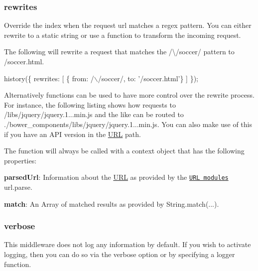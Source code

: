 \subsubsection*{rewrites}

Override the index when the request url matches a regex pattern. You can either rewrite to a static string or use a function to transform the incoming request.

The following will rewrite a request that matches the {\ttfamily /\textbackslash{}/soccer/} pattern to {\ttfamily /soccer.html}. 
\begin{DoxyCode}
history(\{
  rewrites: [
    \{ from: /\(\backslash\)/soccer/, to: '/soccer.html'\}
  ]
\});
\end{DoxyCode}


Alternatively functions can be used to have more control over the rewrite process. For instance, the following listing shows how requests to {\ttfamily /libs/jquery/jquery.1...\+min.\+js} and the like can be routed to {\ttfamily ./bower\+\_\+components/libs/jquery/jquery.1...\+min.\+js}. You can also make use of this if you have an A\+PI version in the \mbox{\hyperlink{namespace_u_r_l}{U\+RL}} path. 


The function will always be called with a context object that has the following properties\+:


\begin{DoxyItemize}
\item {\bfseries parsed\+Url}\+: Information about the \mbox{\hyperlink{namespace_u_r_l}{U\+RL}} as provided by the \href{https://nodejs.org/api/url.html#url_url_parse_urlstr_parsequerystring_slashesdenotehost}{\tt U\+RL module\textquotesingle{}s} {\ttfamily url.\+parse}.
\item {\bfseries match}\+: An Array of matched results as provided by {\ttfamily String.\+match(...)}.
\end{DoxyItemize}

\subsubsection*{verbose}

This middleware does not log any information by default. If you wish to activate logging, then you can do so via the {\ttfamily verbose} option or by specifying a logger function.


